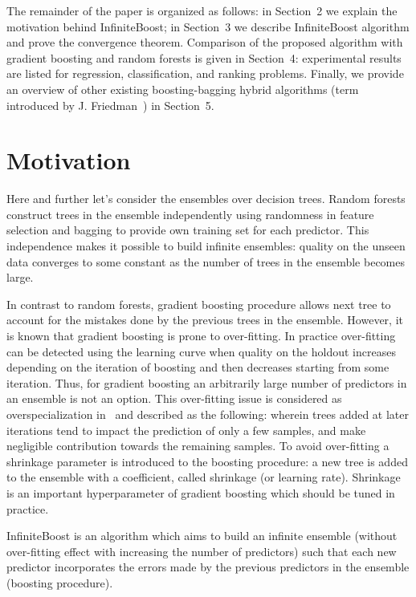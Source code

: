 The remainder of the paper is organized as follows: in Section~2 we explain the motivation behind InfiniteBoost; in Section~3 we describe InfiniteBoost algorithm and prove the convergence theorem.
Comparison of the proposed algorithm with gradient boosting and random forests is given in Section~4: experimental results are listed for regression, classification, and ranking problems. 
Finally, we provide an overview of other existing boosting-bagging hybrid algorithms (term introduced by J. Friedman~\cite{key-sgb}) in Section~5.


\section{Motivation}
Here and further let's consider the ensembles over decision trees.
Random forests construct trees in the ensemble independently using randomness in feature selection and bagging to provide own training set for each predictor.
This independence makes it possible to build infinite ensembles: quality on the unseen data converges to some constant as the number of trees in the ensemble becomes large.

In contrast to random forests, gradient boosting procedure allows next tree to account for the mistakes done by the previous trees in the ensemble.
However, it is known that gradient boosting is prone to over-fitting.
In practice over-fitting can be detected using the learning curve when quality on the holdout increases depending on the iteration of boosting and then decreases starting from some iteration. 
Thus, for gradient boosting an arbitrarily large number of predictors in an ensemble is not an option. 
This over-fitting issue is considered as overspecialization in~\cite{key-dart} and described as the following: wherein trees added at later iterations tend to impact the prediction of only a few samples, and make negligible contribution towards the remaining samples.
To avoid over-fitting a shrinkage parameter is introduced to the boosting procedure: a new tree is added to the ensemble with a coefficient, called shrinkage (or learning rate).
Shrinkage is an important hyperparameter of gradient boosting which should be tuned in practice.

InfiniteBoost is an algorithm which aims to build an infinite ensemble (without over-fitting effect with increasing the number of predictors) such that each new predictor incorporates the errors made by the previous predictors in the ensemble (boosting procedure).

